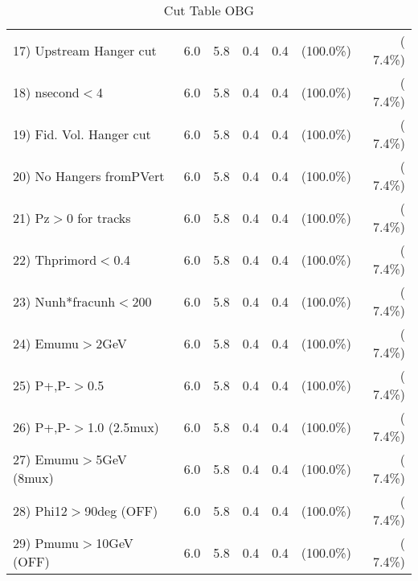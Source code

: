 \begin{table}[h!]
\begin{tabular}{||l||r|r|r|r|r|r||}
 17) Upstream Hanger cut  &          6.0 &          5.8 &          0.4 &          0.4 & (100.0\%) & (  7.4\%) \\
 18) nsecond$<$4          &          6.0 &          5.8 &          0.4 &          0.4 & (100.0\%) & (  7.4\%) \\
 19) Fid. Vol. Hanger cut &          6.0 &          5.8 &          0.4 &          0.4 & (100.0\%) & (  7.4\%) \\
 20) No Hangers fromPVert &          6.0 &          5.8 &          0.4 &          0.4 & (100.0\%) & (  7.4\%) \\
 21) Pz$>$0 for tracks    &          6.0 &          5.8 &          0.4 &          0.4 & (100.0\%) & (  7.4\%) \\
 22) Thprimord$<$0.4      &          6.0 &          5.8 &          0.4 &          0.4 & (100.0\%) & (  7.4\%) \\
 23) Nunh*fracunh$<$200   &          6.0 &          5.8 &          0.4 &          0.4 & (100.0\%) & (  7.4\%) \\
 24) Emumu$>$2GeV         &          6.0 &          5.8 &          0.4 &          0.4 & (100.0\%) & (  7.4\%) \\
 25) P+,P-$>$0.5          &          6.0 &          5.8 &          0.4 &          0.4 & (100.0\%) & (  7.4\%) \\
 26) P+,P-$>$1.0 (2.5mux) &          6.0 &          5.8 &          0.4 &          0.4 & (100.0\%) & (  7.4\%) \\
 27) Emumu$>$5GeV  (8mux) &          6.0 &          5.8 &          0.4 &          0.4 & (100.0\%) & (  7.4\%) \\
 28) Phi12$>$90deg  (OFF) &          6.0 &          5.8 &          0.4 &          0.4 & (100.0\%) & (  7.4\%) \\
 29) Pmumu$>$10GeV  (OFF) &          6.0 &          5.8 &          0.4 &          0.4 & (100.0\%) & (  7.4\%) \\
 \hline
 \hline
 \end{tabular}
 \caption{Cut Table  OBG      }
 \label{tab-cutcohjpsi-mumu_qe}
 \end{table}
